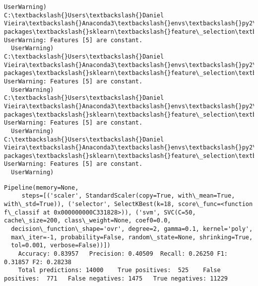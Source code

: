 \documentclass[11pt]{article}
\begin{document}
\begin{Verbatim}[commandchars=\\\{\}]
  UserWarning)
C:\textbackslash{}Users\textbackslash{}Daniel Vieira\textbackslash{}Anaconda3\textbackslash{}envs\textbackslash{}py2\textbackslash{}lib\textbackslash{}site-packages\textbackslash{}sklearn\textbackslash{}feature\_selection\textbackslash{}univariate\_selection.py:113: UserWarning: Features [5] are constant.
  UserWarning)
C:\textbackslash{}Users\textbackslash{}Daniel Vieira\textbackslash{}Anaconda3\textbackslash{}envs\textbackslash{}py2\textbackslash{}lib\textbackslash{}site-packages\textbackslash{}sklearn\textbackslash{}feature\_selection\textbackslash{}univariate\_selection.py:113: UserWarning: Features [5] are constant.
  UserWarning)
C:\textbackslash{}Users\textbackslash{}Daniel Vieira\textbackslash{}Anaconda3\textbackslash{}envs\textbackslash{}py2\textbackslash{}lib\textbackslash{}site-packages\textbackslash{}sklearn\textbackslash{}feature\_selection\textbackslash{}univariate\_selection.py:113: UserWarning: Features [5] are constant.
  UserWarning)
C:\textbackslash{}Users\textbackslash{}Daniel Vieira\textbackslash{}Anaconda3\textbackslash{}envs\textbackslash{}py2\textbackslash{}lib\textbackslash{}site-packages\textbackslash{}sklearn\textbackslash{}feature\_selection\textbackslash{}univariate\_selection.py:113: UserWarning: Features [5] are constant.
  UserWarning)

    \end{Verbatim}

    \begin{Verbatim}[commandchars=\\\{\}]
Pipeline(memory=None,
     steps=[('scaler', StandardScaler(copy=True, with\_mean=True, with\_std=True)), ('selector', SelectKBest(k=18, score\_func=<function f\_classif at 0x000000000C331828>)), ('svm', SVC(C=50, cache\_size=200, class\_weight=None, coef0=0.0,
  decision\_function\_shape='ovr', degree=2, gamma=0.1, kernel='poly',
  max\_iter=-1, probability=False, random\_state=None, shrinking=True,
  tol=0.001, verbose=False))])
	Accuracy: 0.83957	Precision: 0.40509	Recall: 0.26250	F1: 0.31857	F2: 0.28238
	Total predictions: 14000	True positives:  525	False positives:  771	False negatives: 1475	True negatives: 11229


    \end{Verbatim}
\end{document}
